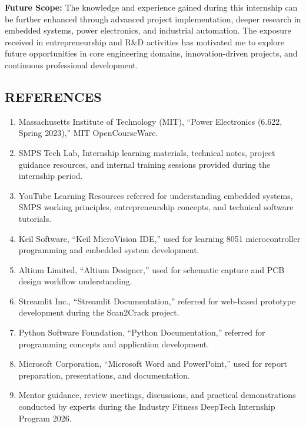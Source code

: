 \documentclass[10pt]{article}
\begin{document}
\noindent
\textbf{Future Scope:} The knowledge and experience gained during this internship can be further enhanced through advanced project implementation, deeper research in embedded systems, power electronics, and industrial automation. The exposure received in entrepreneurship and R\&D activities has motivated me to explore future opportunities in core engineering domains, innovation-driven projects, and continuous professional development.

\newpage
{}
\begin{flushleft}
{\fontsize{16pt}{16pt}\selectfont
\section*{REFERENCES}}
\end{flushleft}

\onehalfspacing
\fontsize{12pt}{14pt}\selectfont
\setlength{\parskip}{6pt}

\begin{enumerate}

\item Massachusetts Institute of Technology (MIT), ``Power Electronics (6.622, Spring 2023),'' MIT OpenCourseWare.

\item SMPS Tech Lab, Internship learning materials, technical notes, project guidance resources, and internal training sessions provided during the internship period.

\item YouTube Learning Resources referred for understanding embedded systems, SMPS working principles, entrepreneurship concepts, and technical software tutorials.

\item Keil Software, ``Keil MicroVision IDE,'' used for learning 8051 microcontroller programming and embedded system development.

\item Altium Limited, ``Altium Designer,'' used for schematic capture and PCB design workflow understanding.

\item Streamlit Inc., ``Streamlit Documentation,'' referred for web-based prototype development during the Scan2Crack project.

\item Python Software Foundation, ``Python Documentation,'' referred for programming concepts and application development.

\item Microsoft Corporation, ``Microsoft Word and PowerPoint,'' used for report preparation, presentations, and documentation.

\item Mentor guidance, review meetings, discussions, and practical demonstrations conducted by experts during the Industry Fitness DeepTech Internship Program 2026.

\end{enumerate}
\end{document}
